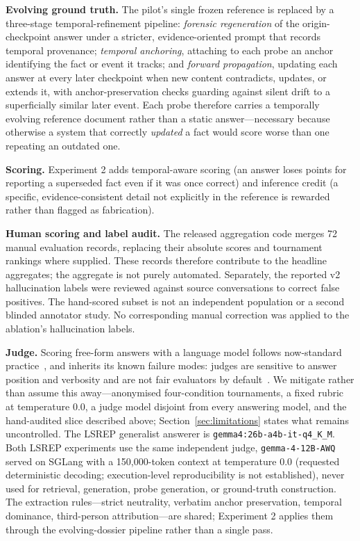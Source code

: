 \documentclass[11pt,a4paper]{article}
\begin{document}
\textbf{Evolving ground truth.} The pilot's single frozen reference is replaced by a three-stage temporal-refinement pipeline: \emph{forensic regeneration} of the origin-checkpoint answer under a stricter, evidence-oriented prompt that records temporal provenance; \emph{temporal anchoring}, attaching to each probe an anchor identifying the fact or event it tracks; and \emph{forward propagation}, updating each answer at every later checkpoint when new content contradicts, updates, or extends it, with anchor-preservation checks guarding against silent drift to a superficially similar later event. Each probe therefore carries a temporally evolving reference document rather than a static answer---necessary because otherwise a system that correctly \emph{updated} a fact would score worse than one repeating an outdated one.

\textbf{Scoring.} Experiment 2 adds temporal-aware scoring (an answer loses points for reporting a superseded fact even if it was once correct) and inference credit (a specific, evidence-consistent detail not explicitly in the reference is rewarded rather than flagged as fabrication).

\textbf{Human scoring and label audit.} The released aggregation code merges 72 manual evaluation records, replacing their absolute scores and tournament rankings where supplied. These records therefore contribute to the headline aggregates; the aggregate is not purely automated. Separately, the reported v2 hallucination labels were reviewed against source conversations to correct false positives. The hand-scored subset is not an independent population or a second blinded annotator study. No corresponding manual correction was applied to the ablation's hallucination labels.

\textbf{Judge.} Scoring free-form answers with a language model follows now-standard practice~\citep{zheng2023judging,liu2023geval}, and inherits its known failure modes: judges are sensitive to answer position and verbosity and are not fair evaluators by default~\citep{wang2024unfair}. We mitigate rather than assume this away---anonymised four-condition tournaments, a fixed rubric at temperature 0.0, a judge model disjoint from every answering model, and the hand-audited slice described above; Section~\ref{sec:limitations} states what remains uncontrolled. The LSREP generalist answerer is \texttt{gemma4:26b-a4b-it-q4\_K\_M}. Both LSREP experiments use the same independent judge, \texttt{gemma-4-12B-AWQ} served on SGLang with a 150{,}000-token context at temperature 0.0 (requested deterministic decoding; execution-level reproducibility is not established), never used for retrieval, generation, probe generation, or ground-truth construction. The extraction rules---strict neutrality, verbatim anchor preservation, temporal dominance, third-person attribution---are shared; Experiment 2 applies them through the evolving-dossier pipeline rather than a single pass.
\end{document}
